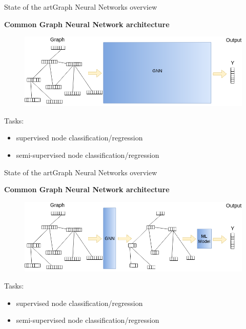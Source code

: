 \documentclass[xcolor=table]{beamer}
\begin{document}
\begin{frame}{State of the art}{Graph Neural Networks overview}

\textbf{Common Graph Neural Network architecture}
\begin{figure}
    \includegraphics[scale=0.37]{./img/GNN_explanation_02.png}
\end{figure}
\vspace{-10px}
Tasks:
\begin{itemize}
    \item supervised node classification/regression
    \item semi-supervised node classification/regression
\end{itemize}

\end{frame}



\begin{frame}{State of the art}{Graph Neural Networks overview}

\textbf{Common Graph Neural Network architecture}
\begin{figure}
    \includegraphics[scale=0.37]{./img/GNN_explanation_03.png}
\end{figure}
\vspace{-10px}
Tasks:
\begin{itemize}
    \item supervised node classification/regression
    \item semi-supervised node classification/regression
\end{itemize}

\end{frame}
\end{document}
